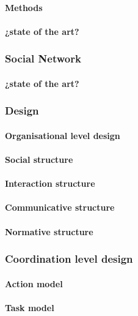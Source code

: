 \documentclass{report}
\begin{document}
				\paragraph{Methods}
				\paragraph{¿state of the art?}
				
			\subsubsection{Social Network}
				\paragraph{¿state of the art?}

			\subsubsection{Design}
				\paragraph{Organisational level design}
				\paragraph{Social structure}
				\paragraph{Interaction structure}
				\paragraph{Communicative structure}
				\paragraph{Normative structure}
				
			\subsubsection{Coordination level design}
				\paragraph{Action model}
				\paragraph{Task model}
\end{document}
